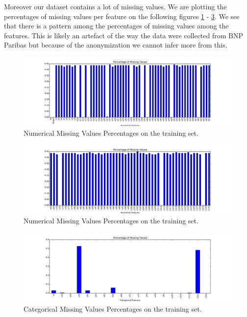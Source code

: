 \documentclass[conference, onecolumn]{IEEEtran}
\begin{document}
Moreover our dataset contains a lot of missing values. We are plotting the percentages of missing values per feature on the following figures \ref{fig_de2a} - \ref{fig_de4}. We see that there is a pattern among the percentages of missing values among the features. This is likely an artefact of the way the data were collected from BNP Paribas but because of the anonymization we cannot infer more from this.
\begin{figure}[htb]
\centering
\includegraphics[width=1\textwidth]{plot_de2a}
\caption{Numerical Missing Values Percentages on the training set.}
\label{fig_de2a}
\end{figure}
%
\begin{figure}[htb]
\centering
\includegraphics[width=1\textwidth]{plot_de2b}
\caption{Numerical Missing Values Percentages on the training set.}
\label{fig_de2b}
\end{figure}
%
\begin{figure}[htb]
\centering
\includegraphics[width=1\textwidth]{plot_de4}
\caption{Categorical Missing Values Percentages on the training set.}
\label{fig_de4}
\end{figure}
\end{document}
